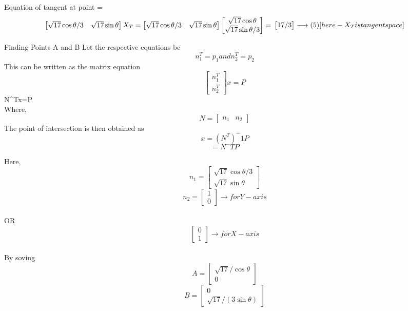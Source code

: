 \documentclass{beamer}
\begin{document}
\begin{frame}
\Rightarrow Equation of tangent at point \theta=\\
$$
\begin{bmatrix}
\sqrt{17}\cos\theta/3 & \sqrt{17}\sin\theta
\end{bmatrix}
X_T=
\begin{bmatrix}
\sqrt{17}\cos\theta/3 & \sqrt{17}\sin\theta
\end{bmatrix}
\begin{bmatrix}
\sqrt{17}\cos\theta\\
\sqrt{17}\sin\theta/3
\end{bmatrix}
=\\
\begin{bmatrix}
17/3
\end{bmatrix}
\longrightarrow (5)[here-X_T  is  tangent  space]$$

\end{frame}
\begin{frame}{Finding Points A and B}
Let the respective equations be
$$n_1^T=p_1 and
n_2^T=p_2$$
This can be written as the matrix equation
$$
\begin{bmatrix}
n_1^T\\
n_2^T
\end{bmatrix}
x=P
$$
\Rightarrow           N^Tx=P\\
Where,$$N=
\begin{bmatrix}
n_1 & n_2
\end{bmatrix}
$$
The point of intersection is then obtained as $$
x=(N^T)^-1P$$
$$=N^-TP$$
\end{frame}
\begin{frame}
Here,
$$n_1=
\begin{bmatrix}
\sqrt{17}\cos\theta/3 \\
\sqrt{17}\sin\theta
\end{bmatrix}
$$
$$
n_2=
\begin{bmatrix}
1\\
0
\end{bmatrix}
\longrightarrow for Y-axis$$\\
OR$$
\begin{bmatrix}
0\\
1
\end{bmatrix}
\longrightarrow for X-axis$$\\
By soving
$$
A=
\begin{bmatrix}
\sqrt{17}/\cos\theta\\
0
\end{bmatrix}
$$
$$B=
\begin{bmatrix}
0\\
\sqrt{17}/(3\sin\theta)
\end{bmatrix}
$$
\end{frame}
\end{document}
